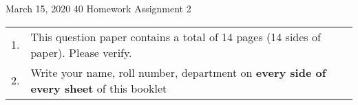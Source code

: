 \documentclass[a4paper, 12pt]{article}
\begin{document}
\vspace*{14ex}

           {March 15, 2020}      					         		%
					 {40}											%
					 {Homework Assignment 2}							%
					
\begin{tabular}{cl}
1. & This question paper contains a total of 14 pages (14 sides of paper). Please verify.\\
2. & Write your name, roll number, department on \textbf{every side of every sheet} of this booklet\\
\end{tabular}
\end{document}
